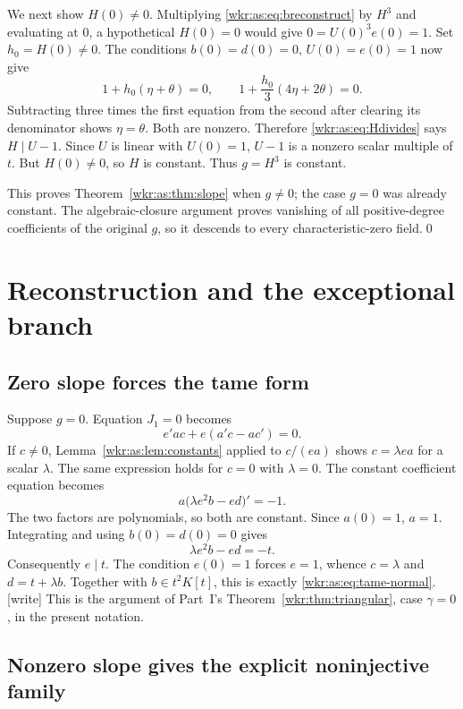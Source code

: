 \documentclass[11pt,a4paper]{article}
\numberwithin{equation}{section}
\theoremstyle{definition}
\theoremstyle{remark}
\begin{document}
We next show $H(0)\ne0$. Multiplying \eqref{wkr:as:eq:breconstruct} by
$H^3$ and evaluating at $0$, a hypothetical $H(0)=0$ would give
$0=U(0)^3e(0)=1$. Set $h_0=H(0)\ne0$. The conditions $b(0)=d(0)=0$,
$U(0)=e(0)=1$ now give
\[
1+h_0(\eta+\theta)=0,\qquad
1+\frac{h_0}{3}(4\eta+2\theta)=0.
\]
Subtracting three times the first equation from the second after clearing
its denominator shows $\eta=\theta$. Both are nonzero. Therefore
\eqref{wkr:as:eq:Hdivides} says $H\mid U-1$. Since $U$ is linear with
$U(0)=1$, $U-1$ is a nonzero scalar multiple of $t$. But $H(0)\ne0$, so
$H$ is constant. Thus $g=H^3$ is constant.

This proves Theorem~\ref{wkr:as:thm:slope} when $g\ne0$; the case $g=0$
was already constant. The algebraic-closure argument proves vanishing of
all positive-degree coefficients of the original $g$, so it descends to
every characteristic-zero field.\qed

\section{Reconstruction and the exceptional branch}
\label{wkr:as:sec:reconstruction}

\subsection{Zero slope forces the tame form}

Suppose $g=0$. Equation $J_1=0$ becomes
\[
e'ac+e(a'c-ac')=0.
\]
If $c\ne0$, Lemma~\ref{wkr:as:lem:constants} applied to $c/(ea)$ shows
$c=\lambda ea$ for a scalar $\lambda$. The same expression holds for
$c=0$ with $\lambda=0$. The constant coefficient equation becomes
\begin{equation}\label{wkr:as:eq:zero-slope}
a\bigl(\lambda e^2b-ed\bigr)'=-1.
\end{equation}
The two factors are polynomials, so both are constant. Since $a(0)=1$,
$a=1$. Integrating and using $b(0)=d(0)=0$ gives
\[
\lambda e^2b-ed=-t.
\]
Consequently $e\mid t$. The condition $e(0)=1$ forces $e=1$, whence
$c=\lambda$ and $d=t+\lambda b$. Together with $b\in t^2K[t]$, this is
exactly \eqref{wkr:as:eq:tame-normal}.
\textup{[write]} This is the argument of Part~I's
Theorem~\ref{wkr:thm:triangular}, case $\gamma=0$, in the present
notation.

\subsection{Nonzero slope gives the explicit noninjective family}
\end{document}
